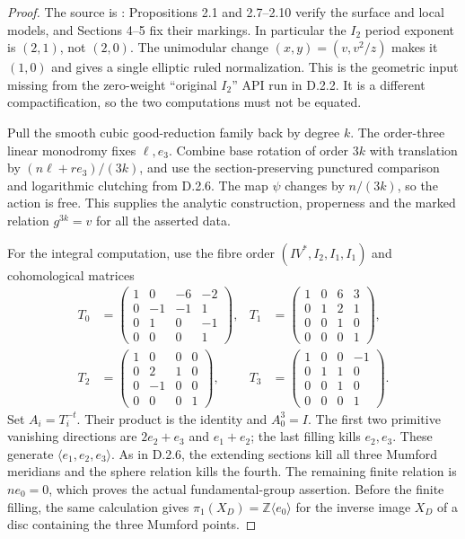 \begin{proof}
The source is \cite{manWang26}: Propositions 2.1 and
2.7--2.10 verify the surface and local models, and
Sections 4--5 fix their markings. In particular the $I_2$ period
exponent is $(2,1)$, not $(2,0)$. The unimodular change
$(x,y)=(v,v^2/z)$ makes it $(1,0)$ and gives a single
elliptic ruled normalization. This is the geometric input
missing from the zero-weight ``original $I_2$'' API run in D.2.2.
It is a different compactification, so the two computations
must not be equated.

Pull the smooth cubic good-reduction family back by degree $k$.
The order-three linear monodromy fixes $\ell,e_3$.
Combine base rotation of order $3k$ with translation by
$(n\ell+r e_3)/(3k)$, and use the section-preserving punctured
comparison and logarithmic clutching from D.2.6. The map $\psi$
changes by $n/(3k)$, so the action is free. This supplies the
analytic construction, properness and the marked relation
$g^{3k}=v$ for all the asserted data.

For the integral computation, use the fibre order
$(IV^*,I_2,I_1,I_1)$ and cohomological matrices
\[
 \begin{aligned}
 T_0&=\begin{pmatrix}1&0&-6&-2\\0&-1&-1&1\\0&1&0&-1\\0&0&0&1\end{pmatrix},
 &T_1&=\begin{pmatrix}1&0&6&3\\0&1&2&1\\0&0&1&0\\0&0&0&1\end{pmatrix},\\
 T_2&=\begin{pmatrix}1&0&0&0\\0&2&1&0\\0&-1&0&0\\0&0&0&1\end{pmatrix},
 &T_3&=\begin{pmatrix}1&0&0&-1\\0&1&1&0\\0&0&1&0\\0&0&0&1\end{pmatrix}.
 \end{aligned}
\]
Set $A_i=T_i^{-t}$. Their product is the identity and
$A_0^3=I$. The first two primitive vanishing directions are
$2e_2+e_3$ and $e_1+e_2$; the last filling kills $e_2,e_3$.
These generate $\langle e_1,e_2,e_3\rangle$. As in D.2.6,
the extending sections kill all three Mumford meridians and
the sphere relation kills the fourth. The remaining finite
relation is $ne_0=0$, which proves the actual fundamental-group
assertion. Before the finite filling, the same calculation
gives $\pi_1(X_D)=\mathbb Z\langle e_0\rangle$ for the
inverse image $X_D$ of a disc containing the three Mumford points.


\end{proof}
